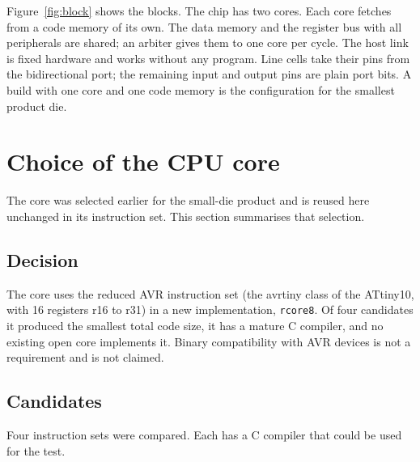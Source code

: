 \documentclass[10pt,a4paper]{article}
\begin{document}
Figure~\ref{fig:block} shows the blocks. The chip has two cores. Each core fetches from a code memory of its own. The data memory and the register bus
with all peripherals are shared; an arbiter gives them to one core per cycle. The host link is fixed hardware
and works without any program. Line cells take their pins from the bidirectional port; the remaining input and
output pins are plain port bits. A build with one core and one code memory is the configuration for the
smallest product die.

\section{Choice of the CPU core}

The core was selected earlier for the small-die product and is reused here unchanged in its instruction set.
This section summarises that selection.

\subsection{Decision}

The core uses the reduced AVR instruction set (the avrtiny class of the ATtiny10, with 16 registers r16 to r31)
in a new implementation, \texttt{rcore8}. Of four candidates it produced the smallest total code size, it has a
mature C compiler, and no existing open core implements it. Binary compatibility with AVR devices is not a
requirement and is not claimed.

\subsection{Candidates}

Four instruction sets were compared. Each has a C compiler that could be used for the test.
\end{document}
